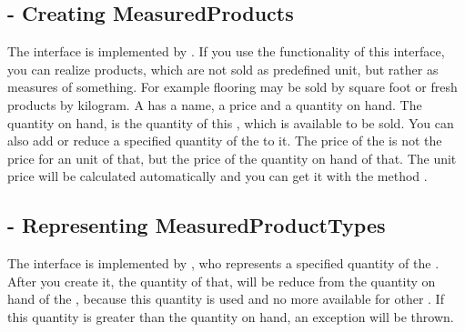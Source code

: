 \subsection{ - Creating MeasuredProducts}
The interface  is implemented by . If you use the functionality of this interface, you can realize products, which are not sold as 
predefined unit, but rather as measures of something. For example flooring may be sold by square foot or fresh products by kilogram.
A  has a name, a price and a quantity on hand. The quantity on hand, is the quantity of this , which is available to 
be sold. You can also add or reduce a specified quantity of the  to it. 
The price of the  is not the price for an unit of that, but the price of the quantity on hand of that. The unit price will be calculated automatically 
and you can get it with the method .

\subsection{ - Representing MeasuredProductTypes}
The interface  is implemented by , who represents a specified quantity of the . After you 
create it, the quantity of that, will be reduce from the quantity on hand of the , because this quantity is used and no more available for other 
. If this quantity is greater than the quantity on hand, an exception will be thrown.
